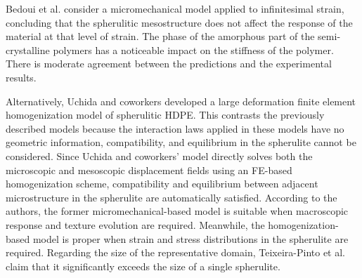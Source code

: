 Bedoui et al. \citep{bedouiMicromechanicalModelingIsotropic2006} consider a micromechanical model applied to infinitesimal strain, concluding that the spherulitic mesostructure does not affect the response of the material at that level of strain.
The phase of the amorphous part of the semi-crystalline polymers has a noticeable impact on the stiffness of the polymer.
There is moderate agreement between the predictions and the experimental results.

Alternatively, Uchida and coworkers \citep{uchidaMicroMesoMacroscopic2013} developed a large deformation finite element homogenization model of spherulitic HDPE.
This contrasts the previously described models because the interaction laws applied in these models have no geometric information, compatibility, and equilibrium in the spherulite cannot be considered.
Since Uchida and coworkers' model directly solves both the microscopic and mesoscopic displacement fields using an FE-based homogenization scheme, compatibility and equilibrium between adjacent microstructure in the spherulite are automatically satisfied.
According to the authors, the former micromechanical-based model is suitable when macroscopic response and texture evolution are required.
Meanwhile, the homogenization-based model is proper when strain and stress distributions in the spherulite are required.
Regarding the size of the representative domain, Teixeira-Pinto et al. \citep{teixeira-pintoSizeEstimationRepresentative2016} claim that it significantly exceeds the size of a single spherulite.


